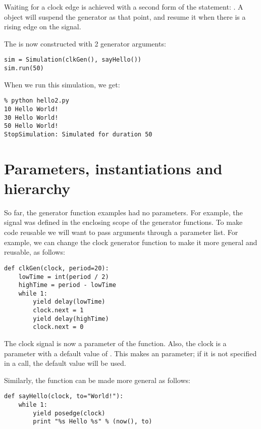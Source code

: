 Waiting for a clock edge is achieved with a second form of the
 statement: . 
A  object will suspend the generator as that point,
and resume it when there is a rising edge on the signal.

The  is now constructed with 2 generator arguments:

\begin{verbatim}
sim = Simulation(clkGen(), sayHello())
sim.run(50)
\end{verbatim}

When we run this simulation, we get:

\begin{verbatim}
% python hello2.py
10 Hello World!
30 Hello World!
50 Hello World!
StopSimulation: Simulated for duration 50
\end{verbatim}


\section{Parameters, instantiations and hierarchy}

So far, the generator function examples had no parameters. For
example, the  signal was defined in the enclosing scope of
the generator functions. To make code reusable we will
want to pass arguments through a parameter list. For example, we can
change the clock generator function to make it more general
and reusable, as follows:

\begin{verbatim}
def clkGen(clock, period=20):
    lowTime = int(period / 2)
    highTime = period - lowTime
    while 1:
        yield delay(lowTime)
        clock.next = 1
        yield delay(highTime)
        clock.next = 0
\end{verbatim}

The clock signal is now a parameter of the function. Also, the clock
 is a parameter with a default value of .
This makes  an  parameter; if it is not
specified in a call, the default value will be used.

Similarly, the  function can be made more general as follows:

\begin{verbatim}
def sayHello(clock, to="World!"):
    while 1:
        yield posedge(clock)
        print "%s Hello %s" % (now(), to)
\end{verbatim}


